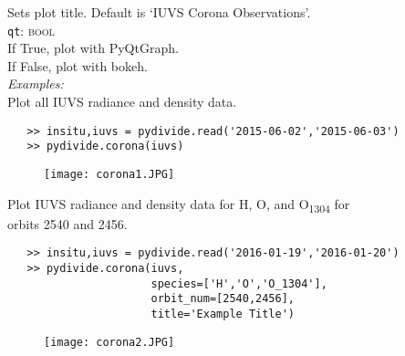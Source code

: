 \documentclass{article}
\begin{document}
\indent \indent Sets plot title. Default is `IUVS Corona Observations'.\\
\indent \texttt{qt}: \textsc{bool}\\
\indent \indent If True, plot with PyQtGraph.\\
\indent \indent If False, plot with bokeh.\\
\noindent \textit{Examples:}\\
\indent Plot all IUVS radiance and density data.
\vspace{-5mm}
\begin{verbatim}
   >> insitu,iuvs = pydivide.read('2015-06-02','2015-06-03')
   >> pydivide.corona(iuvs)
\end{verbatim}
\vspace{-5mm}
\begin{figure}[H]
\centering
\texttt{[image: corona1.JPG]}
\end{figure}
\vspace{-5mm}
\indent Plot IUVS radiance and density data for H, O, and O\textsubscript{1304} for\\
\indent orbits 2540 and 2456.\\
\vspace{-10mm}
\begin{verbatim}
   >> insitu,iuvs = pydivide.read('2016-01-19','2016-01-20')
   >> pydivide.corona(iuvs,
                      species=['H','O','O_1304'],
                      orbit_num=[2540,2456],
                      title='Example Title')
\end{verbatim}
\begin{figure}[H]
\centering
\texttt{[image: corona2.JPG]}
\end{figure}
\end{document}
